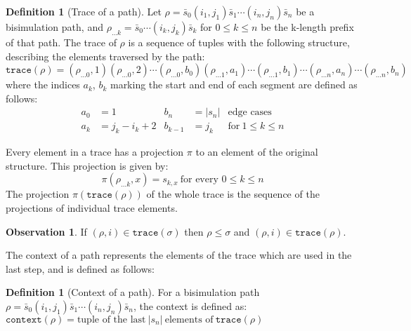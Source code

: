 \documentclass[draft]{scrartcl}
\theoremstyle{definition}
\newtheorem{definition}[theorem]{Definition}
\newtheorem{observation}[theorem]{Observation}
\newcommand{\trace}[1]{\mathtt{trace}(#1)}
\newcommand{\context}[1]{\mathtt{context}(#1)}
\begin{document}
\begin{samepage}
\begin{definition}[Trace of a path]
  Let $\rho = \bar{s}_{0}(i_{1}, j_{1})\bar{s}_{1}\cdots{}(i_{n}, j_{n})\bar{s}_{n}$ be a bisimulation path, and $\rho_{\ldots{}k} = \bar{s}_{0}\cdots(i_{k},j_{k})\bar{s}_{k}$ for $0 \le k \le n$ be the k-length prefix of that path.
  The trace of $\rho$ is a sequence of tuples with the following structure, describing the elements traversed by the path:
  \begin{equation*}
  \trace{\rho} = (\rho_{\ldots{}0}, 1)(\rho_{\ldots{}0}, 2)\cdots{}(\rho_{\ldots{}0}, b_{0})(\rho_{\ldots{}1}, a_{1})\cdots{}(\rho_{\ldots{}1}, b_{1})\cdots(\rho_{\ldots{}n}, a_{n})\cdots(\rho_{\ldots{}n}, b_{n})
  \end{equation*}
  where the indices $a_{k}$, $b_{k}$ marking the start and end of each segment are defined as follows:
  \begin{align*}
    a_{0} &= 1                   & b_{n} &= |s_{n}| & \text{edge cases} \\
    a_{k} &= j_{k} - i_{k} + 2    &  b_{k-1} &= j_{k} & \text{for}\ 1 \le k \le n
  \end{align*}

  Every element in a trace has a projection $\pi$ to an element of the original structure.
  This projection is given by:
  \begin{equation*}
    \pi(\rho_{\ldots{}k},x) = s_{k,x}\ \text{for every $0 \le k \le n$}
  \end{equation*}
  The projection $\pi(\trace{\rho})$ of the whole trace is the sequence of the projections of individual trace elements.
\end{definition}
\end{samepage}

\begin{observation}
  If $(\rho,i) \in \trace{\sigma}$ then $\rho \le \sigma$ and $(\rho, i) \in \trace{\rho}$.
\end{observation}

The context of a path represents the elements of the trace which are used in the last step, and is defined as follows:

\begin{definition}[Context of a path]
  For a bisimulation path $\rho = \bar{s}_{0}(i_{1}, j_{1})\bar{s}_{1}\cdots{}(i_{n}, j_{n})\bar{s}_{n}$, the context is defined as: $\context{\rho} = \text{tuple of the last}\ |s_{n}|\ \text{elements of}\ \trace{\rho}$
\end{definition}
\end{document}
